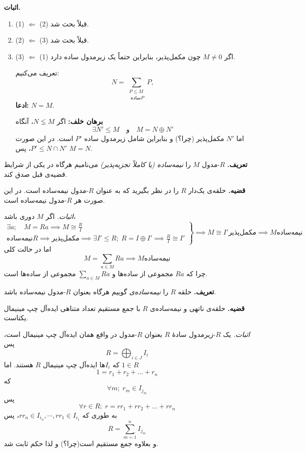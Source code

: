 \textbf{اثبات.}
\begin{enumerate}
    \item [] (1) \(\Leftarrow\) (2) قبلاً بحث شد.
    \item [] (2) \(\Leftarrow\) (3) قبلاً بحث شد.
    \item [] (3) \(\Leftarrow\) (1) اگر \( M \neq 0 \) چون مکمل‌پذیر، بنابراین حتماً یک زیرمدول ساده دارد.

          تعریف می‌کنیم:
          \[
              N = \sum_{\substack{P \leqslant M \\  \text{ ساده} P}} P,
          \]
          \textbf{ادعا: } \(N = M\).

          \textbf{برهان خلف:}
          اگر \( N \lneq M \)، آنگاه
          \[
              \exists N' \leqslant M \quad \text{و} \quad M = N \oplus N'
          \]
          اما \( N' \) مکمل‌پذیر (چرا؟) و بنابراین شامل زیرمدول ساده \( P' \) است. در این صورت \( P' \leqslant N \cap N'\)، پس \( M = N \).

\end{enumerate}

\hrulefill



\textbf{تعریف.} \( R \)-مدول \( M \) را \textit{نیمه‌ساده (یا کاملاً تجزیه‌پذیر)} می‌نامیم هرگاه در یکی از شرایط قضیه‌ی قبل صدق کند.

\hrulefill

\textbf{قضیه.} حلقه‌ی یک‌دار \( R \) را در نظر بگیرید که  به عنوان \( R \)-مدول نیمه‌ساده است. در این صورت هر \( R \)-مدول نیمه‌ساده است.

\textit{اثبات.} اگر \( M \) دوری باشد،
\[
    \left.
    \begin{aligned}
        \exists a; \quad M = Ra \implies M \cong \frac{R}{I} \\
        \text{نیمه‌ساده} R \implies \text{مکمل‌پذیر} \implies \exists I' \leqslant R ; \; R = I \oplus I' \implies \frac{R}{I} \cong I'
    \end{aligned}
    \right\}
    \implies
    M \cong I' \text{مکمل‌پذیر} \implies M \text{نیمه‌ساده}
\]
اما در حالت کلی
\[
    M = \sum_{a \in M} Ra \implies M \text{نیمه‌ساده}
\]
چرا که
\(Ra\)
مجموعی از ساده‌ها و
\(\sum_{a \in M} Ra\)
مجموعی از ساده‌ها است.

\hrulefill

\textbf{تعریف.} حلقه \( R \) را \textit{نیمه‌ساده‌ی } گوییم هرگاه بعنوان \( R \)-مدول نیمه‌ساده باشد.

\hrulefill

\textbf{قضیه.} حلقه‌ی ناتهی و نیمه‌ساده‌ی \( R \) با جمع مستقیم تعداد متناهی ایده‌آل چپ مینیمال یکتاست.

\textit{اثبات.} یک \( R \)-زیرمدول سادهٔ \( R \) بعنوان \( R \)-مدول در واقع
همان
ایده‌آل چپ مینیمال است، پس
\[
    R = \bigoplus_{i \in J} I_i
\]
که \( I_i \)ها ایده‌آل چپ مینیمال \( R \) هستند. اما \( 1 \in R \)
\[
    1 = r_1 + r_2 + \dots + r_n
\]
که
\[
    \forall m ; \; r_m \in I_{j_m}
\]
پس
\[
    \forall r \in R ; \; r = r r_1 + r r_2 + \dots + r r_n
\]
به‌ طوری که
\(rr_n \in I_{i_n}, \cdots, rr_1 \in I_{i_1}\)،
پس
\[
    R = \sum_{m=1}^n I_{j_m}
\]
و بعلاوه جمع مستقیم است(چرا؟)
و لذا حکم ثابت شد.


